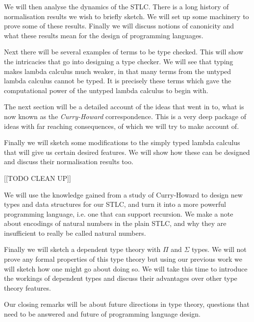 We will then analyse the dynamics of the STLC. There is a long history of normalisation results we wish to briefly sketch. We will set up some machinery to prove some of these results. Finally we will discuss notions of canonicity and what these results mean for the design of programming languages.

Next there will be several examples of terms to be type checked. This will show the intricacies that go into designing a type checker. We will see that typing makes lambda calculus much weaker, in that many terms from the untyped lambda calculus cannot be typed. It is precisely these terms which gave the computational power of the untyped lambda calculus to begin with.

The next section will be a detailed account of the ideas that went in to, what is now known as the \emph{Curry-Howard} correspondence. This is a very deep package of ideas with far reaching consequences, of which we will try to make account of.

Finally we will sketch some modifications to the simply typed lambda calculus that will give us certain desired features. We will show how these can be designed and discuss their normalisation results too.

[[TODO CLEAN UP]]

We will use the knowledge gained from a study of Curry-Howard to design new types and data structures for our STLC, and turn it into a more powerful programming language, i.e. one that can support recursion. We make a note about encodings of natural numbers in the plain STLC, and why they are insufficient to really be called natural numbers.

Finally we will sketch a dependent type theory with $\Pi$ and $\Sigma$ types. We will not prove any formal properties of this type theory but using our previous work we will sketch how one might go about doing so. We will take this time to introduce the workings of dependent types and discuss their advantages over other type theory features.

Our closing remarks will be about future directions in type theory, questions that need to be answered and future of programming language design.







